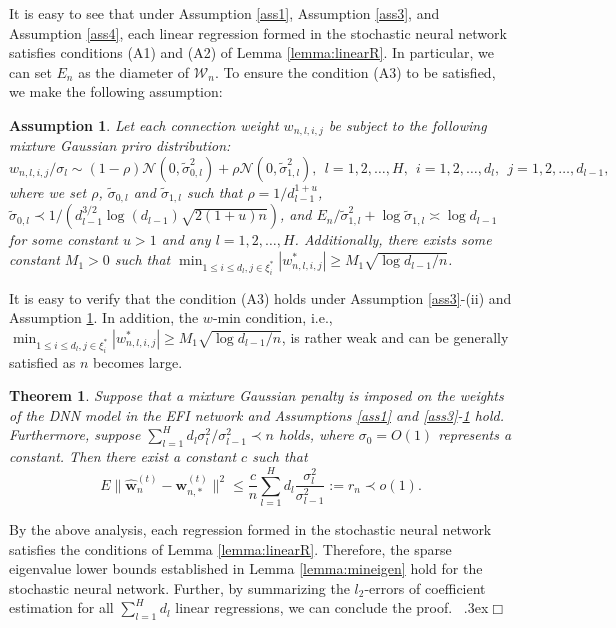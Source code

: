 \documentclass[11pt]{article}
\newcommand{\bw}{{\boldsymbol w}}
\newtheorem{theorem}{Theorem}[section]
\newtheorem{assumption}{Assumption}
\newenvironment{proof}{\trivlist\item[\hskip \labelsep{\sc Proof:}]}
 {\unskip\nobreak\ \lower.3ex\hbox{$\Box$}\endtrivlist}
\begin{document}
It is easy to see that under Assumption \ref{ass1}, Assumption \ref{ass3}, 
and Assumption \ref{ass4}, 
each linear regression formed in the stochastic neural network satisfies 
conditions (A1) and (A2) of Lemma \ref{lemma:linearR}. In particular, we can set 
$E_n$ as the diameter of $\mathcal{W}_n$. 
To ensure the condition (A3) to be satisfied, we make the following assumption: 

\begin{assumption} \label{ass5} Let each connection weight $w_{n,l,i,j}$ be subject 
to the following mixture Gaussian priro distribution:
\[
 w_{n,l,i,j}/\sigma_l \sim (1-\rho) \mathcal{N}(0, \tilde{\sigma}_{0,l}^2)+ \rho \mathcal{N}(0,\tilde{\sigma}_{1,l}^2), \ \ l=1,2,\ldots,H, \ \  i=1,2,\ldots, d_l, \ \  j=1,2,\ldots, d_{l-1}, 
 \]
 where we set $\rho$, $\tilde{\sigma}_{0,l}$ and $\tilde{\sigma}_{1,l}$ such that  
 $\rho=1/d_{l-1}^{1+u}$, 
$\tilde{\sigma}_{0,l} \prec 1/(d_{l-1}^{3/2} \log(d_{l-1}) \sqrt{2(1+u)n})$, and 
$E_n/\tilde{\sigma}_{1,l}^2+\log \tilde{\sigma}_{1,l} \asymp \log d_{l-1}$ 
for some constant $u>1$ and any $l=1,2,\ldots,H$. 
Additionally, there exists some constant $M_1>0$ such that 
 $\min_{1 \leq i \leq d_l, j \in \xi_i^*} |w_{n,l,i,j}^*| \geq M_1 \sqrt{\log d_{l-1}/n}$.
\end{assumption} 

 
 

It is easy to verify that the condition (A3) holds under Assumption \ref{ass3}-(ii) and Assumption \ref{ass5}. In addition, the $w$-min condition, i.e., 
 $\min_{1 \leq i \leq d_l, j \in \xi_i^*} |w_{n,l,i,j}^*| \geq M_1 \sqrt{\log d_{l-1}/n}$, is rather weak and can be generally satisfied as $n$ becomes large.

\begin{theorem} \label{lemma:partI} Suppose that a mixture Gaussian penalty is imposed on the weights of the DNN model in the EFI network and Assumptions 
\ref{ass1} and \ref{ass3}-\ref{ass5} hold. Furthermore, suppose 
$\sum_{l=1}^H d_l \sigma_l^2/\sigma_{l-1}^2 \prec n$ holds, where 
$\sigma_0=O(1)$ represents a constant.  
Then there exist a constant $c$ such that 
\[
E\|\hat{\bw}_n^{(t)} -\bw_{n,*}^{(t)}\|^2 \leq \frac{c}{n} \sum_{l=1}^H d_l \frac{\sigma_l^2}{\sigma_{l-1}^2} :=r_n \prec o(1). 
\]
\end{theorem}

\begin{proof}
By the above analysis, each regression formed in the stochastic neural network 
satisfies the conditions of Lemma \ref{lemma:linearR}. Therefore, 
the sparse eigenvalue lower bounds established in Lemma \ref{lemma:mineigen}  hold for the stochastic neural network.  Further, 
 by summarizing the $l_2$-errors of coefficient estimation for all $\sum_{l=1}^{H} d_l$ linear regressions, we can conclude the proof.  
\end{proof} 
\end{document}
